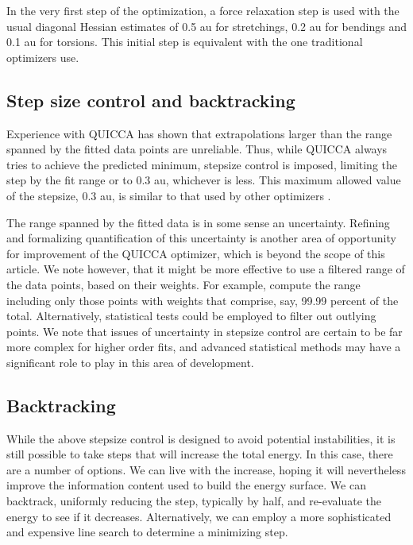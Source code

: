 \documentclass[prl,aps,preprint,showpacs,superbib]{revtex4}
\begin{document}
In the very first step of the optimization, a force relaxation step is used with the usual 
diagonal Hessian estimates of 0.5 au for stretchings, 0.2 au for bendings and 0.1 au for 
torsions.  This initial step is equivalent with the one traditional optimizers use.

\subsection{Step size control and backtracking}

Experience with QUICCA has shown that extrapolations larger 
than the range spanned by the fitted data points are unreliable.   Thus, 
while QUICCA  always tries to achieve the predicted minimum, 
stepsize control is imposed, limiting the step  by  the fit range or to 
0.3 au, whichever is less.   This maximum allowed value of the stepsize, 0.3 au, 
is similar to that used by other optimizers \cite{eckert}.  

The range spanned by the fitted data is in some sense an uncertainty.  
Refining and formalizing quantification of this uncertainty is another area of 
opportunity for improvement of the QUICCA optimizer, which is beyond the 
scope of this article.  We note however, that it might be more effective
to use a filtered range of the data points, based on their weights. 
For example, compute the range including only those points with weights that 
comprise, say,  99.99 percent of the total.   Alternatively, statistical 
tests could be employed to filter out outlying points.  We note that issues of
uncertainty in stepsize control are certain to be far more complex for higher 
order fits, and advanced statistical methods may have a significant role 
to play in this area of development.

\subsection{Backtracking}

While the above stepsize control is designed to avoid potential instabilities,
it is still possible to take steps that will increase the total energy.  In 
this case, there are a number of options.  We can live with the increase, 
hoping it will nevertheless improve the information content used to build the energy 
surface.  We can backtrack, uniformly reducing the step, typically by half, and re-evaluate
the energy to see if it decreases.   Alternatively, we can employ a more 
sophisticated and expensive line search to determine a minimizing step.  
\end{document}
